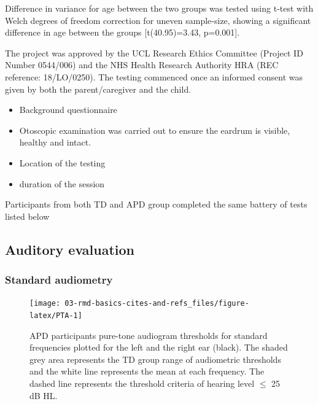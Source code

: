 \documentclass[a4paper,nobind]{templates/ociamthesis}
\providecommand{\tightlist}{%
  \setlength{\itemsep}{0pt}\setlength{\parskip}{0pt}}
\begin{document}
Difference in variance for age between the two groups was tested using
t-test with Welch degrees of freedom correction for uneven sample-size,
showing a significant difference in age between the groups
{[}t(40.95)=3.43, p=0.001{]}.

The project was approved by the UCL Research Ethics Committee (Project
ID Number 0544/006) and the NHS Health Research Authority HRA (REC
reference: 18/LO/0250). The testing commenced once an informed consent
was given by both the parent/caregiver and the child.

\begin{itemize}
\tightlist
\item
  Background questionnaire
\item
  Otoscopic examination was carried out to ensure the eardrum is
  visible, healthy and intact.
\item
  Location of the testing
\item
  duration of the session
\end{itemize}

Participants from both TD and APD group completed the same battery of
tests listed below

\hypertarget{auditory-evaluation}{%
\subsection{Auditory evaluation}\label{auditory-evaluation}}

\hypertarget{standard-audiometry}{%
\subsubsection{\texorpdfstring{\textbf{Standard
audiometry}}{Standard audiometry}}\label{standard-audiometry}}

\begin{figure}

{\centering \texttt{[image: 03-rmd-basics-cites-and-refs\_files/figure-latex/PTA-1]} 

}

\caption{APD participants pure-tone audiogram thresholds for standard frequencies plotted for the left and the right ear (black). The shaded grey area represents the TD group range of audiometric thresholds and the white line represents the mean at each frequency. The dashed line represents the threshold criteria of hearing level $\leq$ 25 dB HL.}\label{fig:PTA}
\end{figure}
\end{document}
